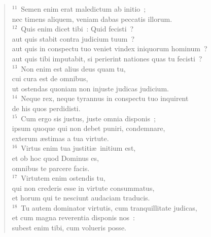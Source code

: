 \begin{flushleft}
\begin{verse}
${}^{11}$~Semen enim erat maledictum ab initio~;\\ nec timens aliquem, veniam dabas peccatis illorum.\\
${}^{12}$~Quis enim dicet tibi~: Quid fecisti~?\\ aut quis stabit contra judicium tuum~?\\ aut quis in conspectu tuo veniet vindex iniquorum hominum~?\\ aut quis tibi imputabit, si perierint nationes quas tu fecisti~?\\
${}^{13}$~Non enim est alius deus quam tu,\\ cui cura est de omnibus,\\ ut ostendas quoniam non injuste judicas judicium.\\
${}^{14}$~Neque rex, neque tyrannus in conspectu tuo inquirent\\ de his quos perdidisti.\\
${}^{15}$~Cum ergo sis justus, juste omnia disponis~;\\ ipsum quoque qui non debet puniri, condemnare,\\ exterum \ae stimas a tua virtute.\\
${}^{16}$~Virtus enim tua justiti\ae\ initium est,\\ et ob hoc quod Dominus es,\\ omnibus te parcere facis.\\
${}^{17}$~Virtutem enim ostendis tu,\\ qui non crederis esse in virtute consummatus,\\ et horum qui te nesciunt audaciam traducis.\\
${}^{18}$~Tu autem dominator virtutis, cum tranquillitate judicas,\\ et cum magna reverentia disponis nos~:\\ subest enim tibi, cum volueris posse.\end{verse}\end{flushleft}


